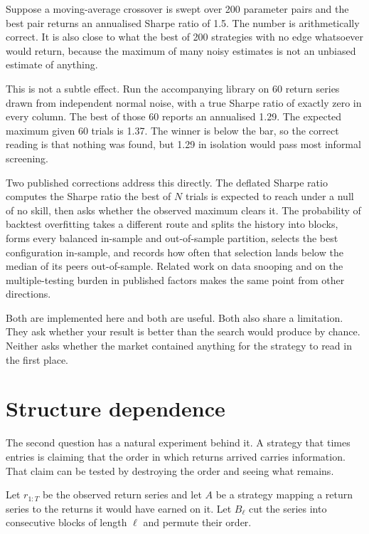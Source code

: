 \documentclass[11pt]{article}
\begin{document}
Suppose a moving-average crossover is swept over 200 parameter pairs and the best pair returns an annualised Sharpe ratio of 1.5. The number is arithmetically correct. It is also close to what the best of 200 strategies with no edge whatsoever would return, because the maximum of many noisy estimates is not an unbiased estimate of anything.

This is not a subtle effect. Run the accompanying library on 60 return series drawn from independent normal noise, with a true Sharpe ratio of exactly zero in every column. The best of those 60 reports an annualised 1.29. The expected maximum given 60 trials is 1.37. The winner is below the bar, so the correct reading is that nothing was found, but 1.29 in isolation would pass most informal screening.

Two published corrections address this directly. The deflated Sharpe ratio \citep{bailey2014deflated} computes the Sharpe ratio the best of $N$ trials is expected to reach under a null of no skill, then asks whether the observed maximum clears it. The probability of backtest overfitting \citep{bailey2016pbo} takes a different route and splits the history into blocks, forms every balanced in-sample and out-of-sample partition, selects the best configuration in-sample, and records how often that selection lands below the median of its peers out-of-sample. Related work on data snooping \citep{white2000reality} and on the multiple-testing burden in published factors \citep{harvey2015backtesting} makes the same point from other directions.

Both are implemented here and both are useful. Both also share a limitation. They ask whether your result is better than the search would produce by chance. Neither asks whether the market contained anything for the strategy to read in the first place.

\section{Structure dependence}\label{sec:dependence}

The second question has a natural experiment behind it. A strategy that times entries is claiming that the order in which returns arrived carries information. That claim can be tested by destroying the order and seeing what remains.

Let $r_{1:T}$ be the observed return series and let $A$ be a strategy mapping a return series to the returns it would have earned on it. Let $B_\ell$ cut the series into consecutive blocks of length $\ell$ and permute their order.
\end{document}
